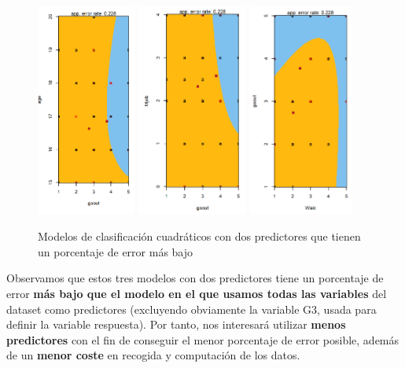 \documentclass[a4paper, 11pt]{article}
\begin{document}
\begin{figure}[h]
\centering
\includegraphics[height=7cm]{capturaemv1.png}
\hfill
\includegraphics[height=7cm]{capturaemv2.png}
\hfill
\includegraphics[height=7cm]{capturaemv3.png}
\caption{Modelos de clasificación cuadráticos con dos predictores que tienen un porcentaje de error más bajo}
\label{fig:tres_imagenes}
\end{figure}

\newpage

Observamos que estos tres modelos con dos predictores tiene un porcentaje de error \textbf{más bajo que el modelo en el que usamos todas las variables} del dataset como predictores (excluyendo obviamente la variable G3, usada para definir la variable respuesta). Por tanto, nos interesará utilizar \textbf{menos predictores} con el fin de conseguir el menor porcentaje de error posible, además de un \textbf{menor coste} en recogida y computación de los datos.
\end{document}
